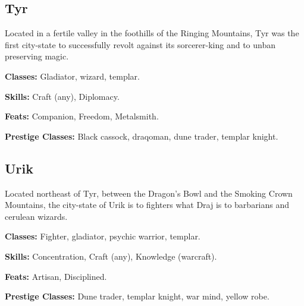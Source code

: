 \subsection{Tyr}
Located in a fertile valley in the foothills of the Ringing Mountains, Tyr was the first city-state to successfully revolt against its sorcerer-king and to unban preserving magic.

\textbf{Classes:} Gladiator, wizard, templar.

\textbf{Skills:} Craft (any), Diplomacy.

\textbf{Feats:} Companion, Freedom, Metalsmith.

\textbf{Prestige Classes:} Black cassock, draqoman, dune trader, templar knight.

\subsection{Urik}
Located northeast of Tyr, between the Dragon's Bowl and the Smoking Crown Mountains, the city-state of Urik is to fighters what Draj is to barbarians and cerulean wizards.

\textbf{Classes:} Fighter, gladiator, psychic warrior, templar.

\textbf{Skills:} Concentration, Craft (any), Knowledge (warcraft).

\textbf{Feats:} Artisan, Disciplined.

\textbf{Prestige Classes:} Dune trader, templar knight, war mind, yellow robe.
